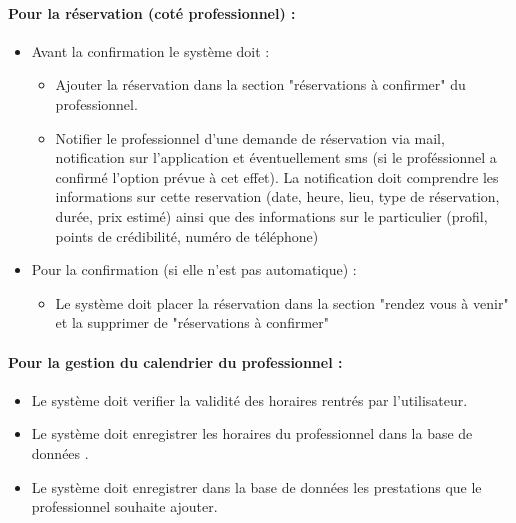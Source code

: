 \documentclass{article}
\begin{document}
\paragraph{Pour la réservation (coté professionnel) :}
\begin{itemize}
\item Avant la confirmation le système doit :
	\begin{itemize}
	\item Ajouter la réservation dans la section "réservations à confirmer" du  professionnel.
    \item Notifier le professionnel d'une demande de réservation via mail, notification sur l'application et éventuellement sms (si le proféssionnel a confirmé l'option prévue à cet effet).
		La notification doit comprendre les informations sur cette reservation (date, heure, lieu, type de réservation, durée, prix estimé)
		ainsi que des informations sur le particulier (profil, points de crédibilité, numéro de téléphone)
	\end{itemize}
\item Pour la confirmation (si elle n'est pas automatique) :
	\begin{itemize}
	\item Le système doit placer la réservation dans la section "rendez vous à venir" et la supprimer de "réservations à confirmer"
	\end{itemize}
\end{itemize}






\paragraph{Pour la gestion du calendrier du professionnel :}
\begin{itemize}
\item Le système doit verifier la validité des horaires rentrés par l'utilisateur.
\item Le système doit enregistrer les horaires du professionnel dans
  la base de données .
\item Le système doit enregistrer dans la base de données les prestations que le professionnel souhaite ajouter.
\end{itemize}
\end{document}
